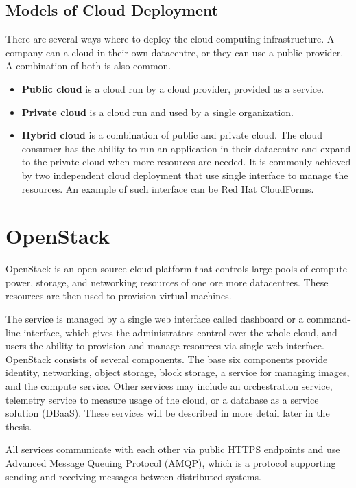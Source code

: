 \subsection{Models of Cloud Deployment}
There are several ways \cite{CL210} where to deploy the cloud computing infrastructure. A company can a cloud in their own datacentre, or they can use a public provider. A combination of both is also common.
\begin{itemize}
  \item{\textbf{Public cloud} is a cloud run by a cloud provider, provided as a service.}
  \item{\textbf{Private cloud} is a cloud run and used by a single organization.}
  \item{\textbf{Hybrid cloud} is a combination of public and private cloud. The cloud consumer has the ability to run an application in their datacentre and expand to the private cloud when more resources are needed. It is commonly achieved by two independent cloud deployment that use single interface to manage the resources. An example of such interface can be Red Hat CloudForms.}
\end{itemize}


\section{OpenStack}
OpenStack is an open-source cloud platform that controls large pools of compute power, storage, and networking resources of one ore more datacentres. These resources are then used to provision virtual machines.

The service is managed by a single web interface called dashboard or a command-line interface, which gives the administrators control over the whole cloud, and users the ability to provision and manage resources via single web interface.
OpenStack consists of several components. The base six components provide identity, networking, object storage, block storage, a service for managing images, and the compute service. Other services may include an orchestration service, telemetry service to measure usage of the cloud, or a database as a service solution (DBaaS). These services will be described in more detail later in the thesis.

All services communicate with each other via public HTTPS endpoints and use Advanced Message Queuing Protocol (AMQP), which is a protocol supporting sending and receiving messages between distributed systems. \cite{CL210}

